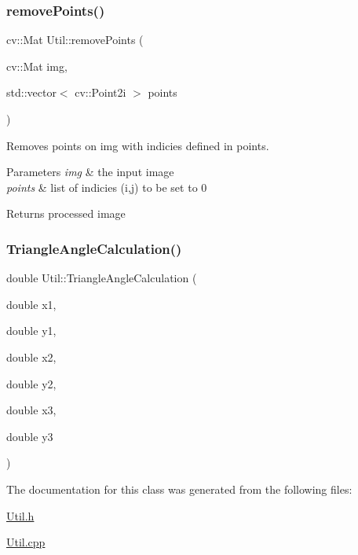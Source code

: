\hypertarget{class_util_abf2cc717b8e145166f247df2742a0325}{}\label{class_util_abf2cc717b8e145166f247df2742a0325} 
\subsubsection{\texorpdfstring{remove\+Points()}{removePoints()}}
{\footnotesize\ttfamily cv\+::\+Mat Util\+::remove\+Points (\begin{DoxyParamCaption}\item[{cv\+::\+Mat}]{img,  }\item[{std\+::vector$<$ cv\+::\+Point2i $>$}]{points }\end{DoxyParamCaption})\hspace{0.3cm}{\ttfamily [static]}}



Removes points on img with indicies defined in points. 


\begin{DoxyParams}{Parameters}
{\em img} & the input image \\
\hline
{\em points} & list of indicies (i,j) to be set to 0 \\
\hline
\end{DoxyParams}
\begin{DoxyReturn}{Returns}
processed image 
\end{DoxyReturn}
\hypertarget{class_util_a05321942460c7b903b8b8ae54d170bb8}{}\label{class_util_a05321942460c7b903b8b8ae54d170bb8} 
\subsubsection{\texorpdfstring{Triangle\+Angle\+Calculation()}{TriangleAngleCalculation()}}
{\footnotesize\ttfamily double Util\+::\+Triangle\+Angle\+Calculation (\begin{DoxyParamCaption}\item[{double}]{x1,  }\item[{double}]{y1,  }\item[{double}]{x2,  }\item[{double}]{y2,  }\item[{double}]{x3,  }\item[{double}]{y3 }\end{DoxyParamCaption})\hspace{0.3cm}{\ttfamily [static]}}



The documentation for this class was generated from the following files\+:\begin{DoxyCompactItemize}
\item 
\hyperlink{_util_8h}{Util.\+h}\item 
\hyperlink{_util_8cpp}{Util.\+cpp}\end{DoxyCompactItemize}
